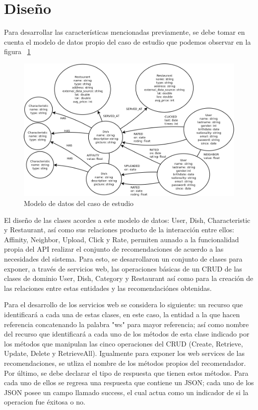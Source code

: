 
  \section{Diseño}

    Para desarrollar las características mencionadas previamente, se debe tomar en cuenta el modelo de datos propio del caso de estudio que podemos observar en la figura ~\ref{fig:model_cs}

    \begin{landscape}
      \begin{figure}[h!]
        \centering
        \includegraphics[width=25cm]{./images/sc_data_model}
        \caption{Modelo de datos del caso de estudio}
        \label{fig:model_cs}
      \end{figure}
    \end{landscape}

    El diseño de las clases acordes a este modelo de datos: User, Dish, Characteristic y Restaurant, así como sus relaciones producto de la interacción entre ellos: Affinity, Neighbor, Upload, Click y Rate, permiten aunado a la funcionalidad propia del API realizar el conjunto de recomendaciones de acuerdo a las necesidades del sistema. Para esto, se desarrollaron un conjunto de clases para exponer, a través de servicios web, las operaciones básicas de un CRUD de las clases de dominio User, Dish, Category y Restaurant así como para la creación de las relaciones entre estas entidades y las recomendaciónes obtenidas.

  Para el desarrollo de los servicios web se considera lo siguiente: un recurso que identificará a cada una de estas clases, en este caso, la entidad a la que hacen referencia concatenando la palabra "ws" para mayor referencia; así como nombre del recurso que identificará a cada uno de los métodos de esta clase indicado por los métodos que manipulan las cinco operaciones del CRUD (Create, Retrieve, Update, Delete y RetrieveAll). Igualmente para exponer los web services de las recomendaciones, se utliza el nombre de los métodos propios del recomendador. Por último, se debe declarar el tipo de respuesta que tienen estos métodos. Para cada uno de ellos se regresa una respuesta que contiene un JSON; cada uno de los JSON posee un campo llamado success, el cual actua como un indicador de si la operacion fue éxitosa o no.

